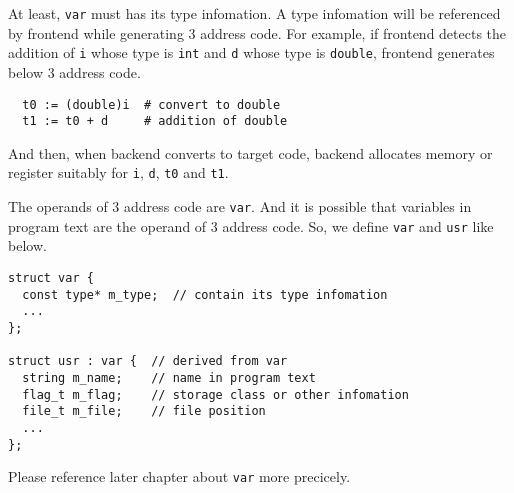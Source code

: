 At least, {\tt{var}} must has its type infomation.
A type infomation will be referenced by frontend while generating
3 address code. For example, if frontend detects the addition of
{\tt{i}} whose type is {\tt{int}} and {\tt{d}} whose type is
{\tt{double}}, frontend generates below 3 address code.
\begin{verbatim}
  t0 := (double)i  # convert to double
  t1 := t0 + d     # addition of double
\end{verbatim}
And then, when backend converts to target code,
backend allocates memory or register suitably for
{\tt{i}}, {\tt{d}}, {\tt{t0}} and {\tt{t1}}.

The operands of 3 address code are {\tt{var}}. And it is
possible that variables in program text are the operand of 3 address code.
So, we define {\tt{var}} and {\tt{usr}} like below.
\begin{verbatim}
struct var {
  const type* m_type;  // contain its type infomation
  ...
};

struct usr : var {  // derived from var
  string m_name;    // name in program text
  flag_t m_flag;    // storage class or other infomation
  file_t m_file;    // file position
  ...
};
\end{verbatim}
Please reference later chapter about {\tt{var}} more
precicely.

